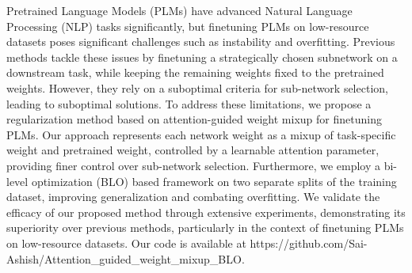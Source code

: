Pretrained Language Models (PLMs) have advanced Natural Language Processing (NLP) tasks significantly, but finetuning PLMs on low-resource datasets poses significant challenges such as instability and overfitting. Previous methods tackle these issues by finetuning a strategically chosen subnetwork on a downstream task, while keeping the remaining weights fixed to the pretrained weights. However, they rely on a suboptimal criteria for sub-network selection, leading to suboptimal solutions. To address these limitations, we propose a regularization method based on attention-guided weight mixup for finetuning PLMs. Our approach represents each network weight as a mixup of task-specific weight and pretrained weight, controlled by a learnable attention parameter, providing finer control over sub-network selection. Furthermore, we employ a bi-level optimization (BLO) based framework on two separate splits of the training dataset, improving generalization and combating overfitting. We validate the efficacy of our proposed method through extensive experiments, demonstrating its superiority over previous methods, particularly in the context of finetuning PLMs on low-resource datasets. Our code is available at https://github.com/Sai-Ashish/Attention\_guided\_weight\_mixup\_BLO.